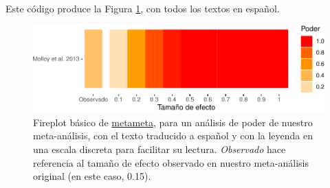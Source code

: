\documentclass[
  bookmarksnumbered]{article}
\newenvironment{Shaded}{\begin{snugshade}}{\end{snugshade}}
\newcommand{\AttributeTok}[1]{\textcolor[rgb]{0.00,0.34,0.68}{#1}}
\newcommand{\ConstantTok}[1]{\textcolor[rgb]{0.67,0.33,0.00}{#1}}
\newcommand{\DecValTok}[1]{\textcolor[rgb]{0.69,0.50,0.00}{#1}}
\newcommand{\FloatTok}[1]{\textcolor[rgb]{0.69,0.50,0.00}{#1}}
\newcommand{\FunctionTok}[1]{\textcolor[rgb]{0.39,0.29,0.61}{#1}}
\newcommand{\NormalTok}[1]{\textcolor[rgb]{0.12,0.11,0.11}{#1}}
\newcommand{\OtherTok}[1]{\textcolor[rgb]{0.00,0.43,0.16}{#1}}
\newcommand{\SpecialCharTok}[1]{\textcolor[rgb]{0.24,0.68,0.91}{#1}}
\newcommand{\StringTok}[1]{\textcolor[rgb]{0.75,0.01,0.01}{#1}}
\begin{document}
\begin{Shaded}
\end{Shaded}

Este código produce la Figura \ref{fig:fire-plot2}, con todos los textos en español.

\begin{figure}
\centering
\includegraphics{Meta-analysis_files/figure-latex/fire-plot2-1.pdf}
\caption{\label{fig:fire-plot2}Fireplot básico de \href{https://www.dsquintana.blog/metameta-r-package-meta-analysis/}{metameta}, para un análisis de poder de nuestro meta-análisis, con el texto traducido a español y con la leyenda en una escala discreta para facilitar su lectura. \emph{Observado} hace referencia al tamaño de efecto observado en nuestro meta-análisis original (en este caso, 0.15).}
\end{figure}
\end{document}
